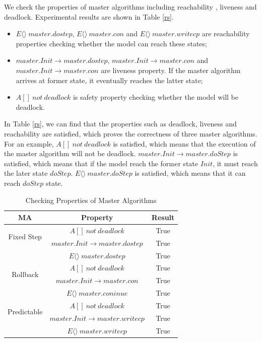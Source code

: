 We check the properties of master algorithms including reachability , liveness and deadlock. Experimental results are shown in Table \ref{rs}.

\begin{itemize}
\item
$E\langle\rangle~master.dostep$, $E\langle\rangle~master.con$ and $E\langle\rangle~master.writecp$ are reachability properties checking whether the model can reach these states;
\item
$master.Init \rightarrow master.dostep$, $master.Init \rightarrow master.con$ and $master.Init \rightarrow master.con$ are liveness property. If the master algorithm arrives at former state, it eventually reaches the latter state;
\item
$A[]~not~deadlock$ is safety property checking whether the model will be deadlock.
\end{itemize}

In Table \ref{rs}, we can find that the properties such as deadlock, liveness and reachability are satisfied,  which proves the correctness of three master algorithms. For an example, $A[]~not~deadlock$ is satisfied, which means that the execution of the master algorithm will not be deadlock. $master.Init \rightarrow master.doStep$ is satisfied, which means that if the model reach the former state $Init$, it must reach the later state $doStep$. $E\langle\rangle~master.doStep$ is satisfied, which means that it can reach $doStep$ state. 

\begin{table}
\caption{Checking Properties of Master Algorithms}
\centering
\begin{tabular}{c c c}
        \hline
        MA & Property & Result\\
        \hline
        \multirow{2}{2.0cm}{Fixed Step}
                & $A[]~not~deadlock$ & True\\
                & $master.Init \rightarrow master.dostep$ & True\\
                & $E\langle\rangle~master.dostep$ & True\\

        \hline
        \multirow{2}{2.0cm}{Rollback}
                & $A[]~not~deadlock$ & True\\
                & $master.Init \rightarrow master.con$ & True\\
                & $E\langle\rangle~master.coninue$ & True\\

        \hline
        \multirow{2}{2.0cm}{Predictable}
                & $A[]~not~deadlock$ & True\\
                & $master.Init \rightarrow  master.writecp$ & True\\
                & $E\langle\rangle~master.writecp$ & True\\
        \hline
\end{tabular}
\label{ta_rs}
\end{table}